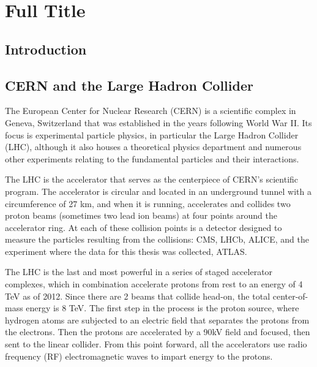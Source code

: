  

\chapter[ATLASDetector]{Full Title}




\section{Introduction}

\section{CERN and the Large Hadron Collider}
The European Center for Nuclear Research (CERN) is a scientific complex in Geneva, Switzerland that was established in the years following World War II.  Its focus is experimental particle physics, in particular the Large Hadron Collider (LHC), although it also houses a theoretical physics department and numerous other experiments relating to the fundamental particles and their interactions.  

The LHC is the accelerator that serves as the centerpiece of CERN's scientific program.  The accelerator is circular and located in an underground tunnel with a circumference of 27 km, and when it is running, accelerates and collides two proton beams (sometimes two lead ion beams) at four points around the accelerator ring.  At each of these collision points is a detector designed to measure the particles resulting from the collisions: CMS, LHCb, ALICE, and the experiment where the data for this thesis was collected, ATLAS.

The LHC is the last and most powerful in a series of staged accelerator complexes, which in combination accelerate protons from rest to an energy of 4 TeV as of 2012.  Since there are 2 beams that collide head-on, the total center-of-mass energy is 8 TeV.  The first step in the process is the proton source, where hydrogen atoms are subjected to an electric field that separates the protons from the electrons.  Then the protons are accelerated by a 90kV field and focused, then sent to the linear collider.  From this point forward, all the accelerators use radio frequency (RF) electromagnetic waves to impart energy to the protons.  

